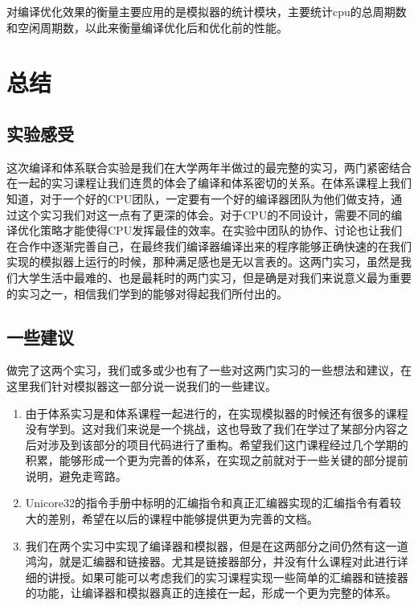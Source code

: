 \documentclass[12pt,a4paper]{article}
\begin{document}
对编译优化效果的衡量主要应用的是模拟器的统计模块，主要统计cpu的总周期数和空闲周期数，以此来衡量编译优化后和优化前的性能。

\section{总结}

\subsection{实验感受}

这次编译和体系联合实验是我们在大学两年半做过的最完整的实习，两门紧密结合在一起的实习课程让我们连贯的体会了编译和体系密切的关系。在体系课程上我们知道，对于一个好的CPU团队，一定要有一个好的编译器团队为他们做支持，通过这个实习我们对这一点有了更深的体会。对于CPU的不同设计，需要不同的编译优化策略才能使得CPU发挥最佳的效率。在实验中团队的协作、讨论也让我们在合作中逐渐完善自己，在最终我们编译器编译出来的程序能够正确快速的在我们实现的模拟器上运行的时候，那种满足感也是无以言表的。这两门实习，虽然是我们大学生活中最难的、也是最耗时的两门实习，但是确是对我们来说意义最为重要的实习之一，相信我们学到的能够对得起我们所付出的。

\subsection{一些建议}

做完了这两个实习，我们或多或少也有了一些对这两门实习的一些想法和建议，在这里我们针对模拟器这一部分说一说我们的一些建议。

\begin{enumerate}
	\item 由于体系实习是和体系课程一起进行的，在实现模拟器的时候还有很多的课程没有学到。这对我们来说是一个挑战，这也导致了我们在学过了某部分内容之后对涉及到该部分的项目代码进行了重构。希望我们这门课程经过几个学期的积累，能够形成一个更为完善的体系，在实现之前就对于一些关键的部分提前说明，避免走弯路。
	\item Unicore32的指令手册中标明的汇编指令和真正汇编器实现的汇编指令有着较大的差别，希望在以后的课程中能够提供更为完善的文档。
	\item 我们在两个实习中实现了编译器和模拟器，但是在这两部分之间仍然有这一道鸿沟，就是汇编器和链接器。尤其是链接器部分，并没有什么课程对此进行详细的讲授。如果可能可以考虑我们的实习课程实现一些简单的汇编器和链接器的功能，让编译器和模拟器真正的连接在一起，形成一个更为完整的体系。
\end{enumerate}
\end{document}
